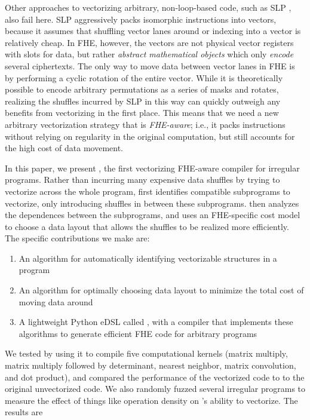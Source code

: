 Other approaches to vectorizing arbitrary, non-loop-based code, such as SLP \cite{SLP}, also fail here.
SLP aggressively packs isomorphic instructions into vectors, because it assumes that shuffling vector lanes around or indexing into a vector is relatively cheap.
In FHE, however, the vectors are not physical vector registers with slots for data, but rather {\em abstract mathematical objects} which only {\em encode} several ciphertexts.
The only way to move data between vector lanes in FHE is by performing a cyclic rotation of the entire vector.
While it is theoretically possible to encode arbitrary permutations as a series of masks and rotates, realizing the shuffles incurred by SLP in this way can quickly outweigh any benefits from vectorizing in the first place.
This means that we need a new arbitrary vectorization strategy that is {\em FHE-aware}; i.e., it packs instructions without relying on regularity in the original computation, but still accounts for the high cost of data movement.

In this paper, we present \system, the first vectorizing FHE-aware compiler for irregular programs.
Rather than incurring many expensive data shuffles by trying to vectorize across the whole program, \system first identifies compatible subprograms to vectorize, only introducing shuffles in between these subprograms.
\system then analyzes the dependences between the subprograms, and uses an FHE-specific cost model to choose a data layout that allows the shuffles to be realized more efficiently.
The specific contributions we make are:
\begin{enumerate}
    \item An algorithm for automatically identifying vectorizable structures in a program
    \item An algorithm for optimally choosing data layout to minimize the total cost of moving data around
    \item A lightweight Python eDSL called \system, with a compiler that implements these algorithms to generate efficient FHE code for arbitrary programs 
\end{enumerate}

We tested \system by using it to compile five computational kernels (matrix multiply, matrix multiply followed by determinant, nearest neighbor, matrix convolution, and dot product), and compared the performance of the vectorized code to to the original unvectorized code.
We also randomly fuzzed several irregular programs to measure the effect of things like operation density on \system's ability to vectorize. 
The results are 
